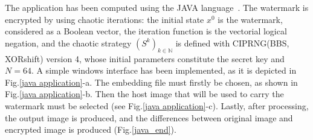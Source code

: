 The application has been computed using the JAVA language~\cite{java}. The watermark is encrypted by using chaotic iterations: the initial state $x^{0}$ is the watermark, considered as a Boolean vector, the iteration function is the vectorial logical negation, and the chaotic strategy $(S^{k})_{k\in \mathds{N}}$ is defined with CIPRNG(BBS, XORshift) version 4, whose initial parameters constitute the secret key and $N=64$.  
A simple windows interface has been implemented, as it is depicted in Fig.\ref{java application}-a.
The embedding file must firstly be chosen, as shown in Fig.\ref{java application}-b. 
Then the host image that will be used to carry the watermark must be selected (see Fig.\ref{java application}-c). Lastly, after processing, the output image is produced, and the differences between original image and encrypted image is produced (Fig.\ref{java_end}).

